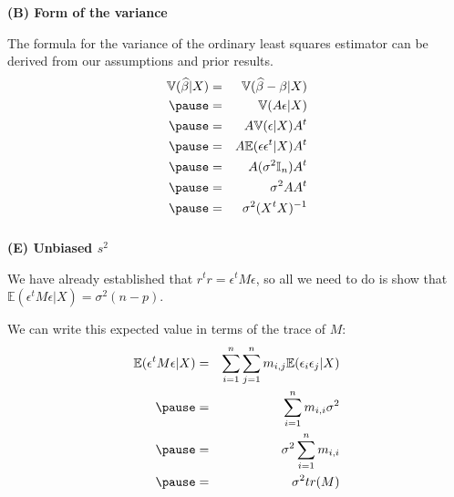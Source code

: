\begin{frame}[fragile] \frametitle{}

{\bf (B) Form of the variance }

The formula for the variance of the ordinary least squares estimator
can be derived from our assumptions and prior results.
\begin{eqnarray*}
\mathbb{V} ( \widehat{\beta} | X ) &=& \mathbb{V} ( \widehat{\beta} - \beta | X) \\ \pause
&=& \mathbb{V} ( A \epsilon | X) \\ \pause
&=& A \mathbb{V} ( \epsilon | X) A^t \\ \pause
&=& A \mathbb{E} ( \epsilon \epsilon^t | X) A^t \\ \pause
&=& A (\sigma^2 \mathbb{I}_n ) A^t \\ \pause
&=& \sigma^2 A A^t \\ \pause
&=& \sigma^2 (X^{t} X)^{-1}
\end{eqnarray*}

\end{frame}

\begin{frame}[fragile] \frametitle{}

{\bf (E) Unbiased $s^2$}

We have already established that $r^t r = \epsilon^t M \epsilon$,
so all we need to do is show that
$\mathbb{E} (\epsilon^t M \epsilon | X) = \sigma^2 (n-p)$. \pause

We can write this expected value in terms of the trace of $M$:
\begin{eqnarray*}
\mathbb{E} (\epsilon^t M \epsilon | X)
&=& \sum_{i=1}^n \sum_{j=1}^n m_{i,j} \mathbb{E} (\epsilon_i \epsilon_j | X) \\ \pause
&=& \sum_{i=1}^n m_{i,i} \sigma^2 \\ \pause
&=& \sigma^2 \sum_{i=1}^n m_{i,i} \\ \pause
&=& \sigma^2 tr(M)
\end{eqnarray*}

\end{frame}


